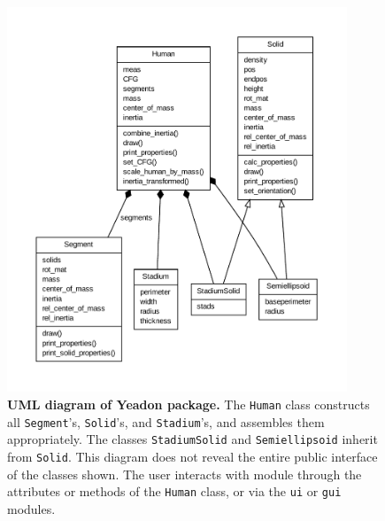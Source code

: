 \documentclass[10pt]{article}
\begin{document}
\begin{figure}[!ht]
  \begin{center}
    \includegraphics[width=4in]{figfactory/umldiagram/umldiagram.pdf}
  \end{center}
  \cprotect\caption{
    {\bf UML diagram of Yeadon package.}
    The \verb+Human+ class constructs all \verb+Segment+'s, \verb+Solid+'s, and
    \verb+Stadium+'s, and assembles them appropriately. The classes
    \verb+StadiumSolid+ and \verb+Semiellipsoid+ inherit from \verb+Solid+.
    This diagram does not reveal the entire public interface of the classes
    shown. The user interacts with module through the attributes or methods of
    the \verb+Human+ class, or via the \verb+ui+ or \verb+gui+ modules.
  }
  \label{fig:umldiagram}
\end{figure}
\end{document}

